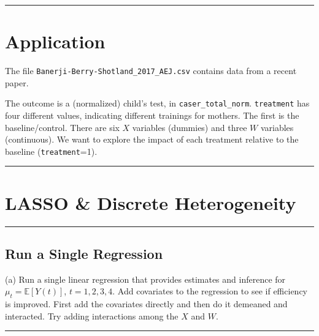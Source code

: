 \documentclass{article}
\newenvironment{colorparagraph}[1]{\par\color{#1}}{\par}
\begin{document}
\begin{colorparagraph}{questioncolor}

\rule{\textwidth}{0.5pt}
\label{q3}
\section{Application}

The file \texttt{Banerji-Berry-Shotland\_2017\_AEJ.csv} contains data from a recent paper.

The outcome is a (normalized) child's test, in \texttt{caser\_total\_norm}. \texttt{treatment} has four different values, indicating different trainings for mothers. The first is the baseline/control. There are six \( X \) variables (dummies) and three \( W \) variables (continuous). We want to explore the impact of each treatment relative to the baseline (\texttt{treatment}=1).

\rule{\textwidth}{0.5pt}
\end{colorparagraph}

\begin{colorparagraph}{questioncolor}
\section*{LASSO \& Discrete Heterogeneity}
\label{q3a}
\rule{\textwidth}{0.5pt}
\subsection{Run a Single Regression}
(a) Run a single linear regression that provides estimates and inference for \( \mu_t = \mathbb{E}[Y(t)] \), \( t = 1, 2, 3, 4 \). Add covariates to the regression to see if efficiency is improved. First add the covariates directly and then do it demeaned and interacted. Try adding interactions among the \( X \) and \( W \).

\rule{\textwidth}{0.5pt}
\end{colorparagraph}
\end{document}
